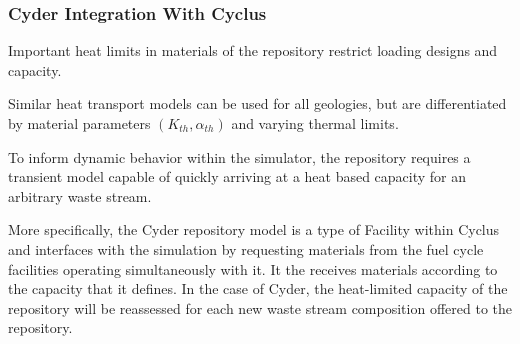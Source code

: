 \subsubsection{Cyder Integration With Cyclus}
  Important heat limits in materials of the repository restrict loading designs 
  and capacity.
  

  Similar heat transport models can be used for all geologies, but are 
  differentiated by material parameters $(K_{th}, \alpha_{th})$ and varying 
  thermal limits.

To inform dynamic behavior within the simulator, the repository requires 
a transient model capable of quickly arriving at a heat based 
capacity for an arbitrary waste stream. 

More specifically, the Cyder repository model is a type of Facility within 
Cyclus and interfaces with the simulation by requesting materials from the fuel 
cycle facilities operating simultaneously with it. It the receives materials 
according to the capacity that it defines. In the case of Cyder, the 
heat-limited capacity of the repository will be reassessed for each new waste 
stream composition offered to the repository.


